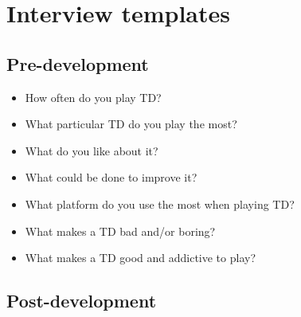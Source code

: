 \chapter{Interview templates}

\section{Pre-development}

\begin{itemize}
\item How often do you play TD?
\item What particular TD do you play the most?
\item What do you like about it?
\item What could be done to improve it?
\item What platform do you use the most when playing TD?
\item What makes a TD bad and/or boring?
\item What makes a TD good and addictive to play?
\end{itemize}

\section{Post-development}

